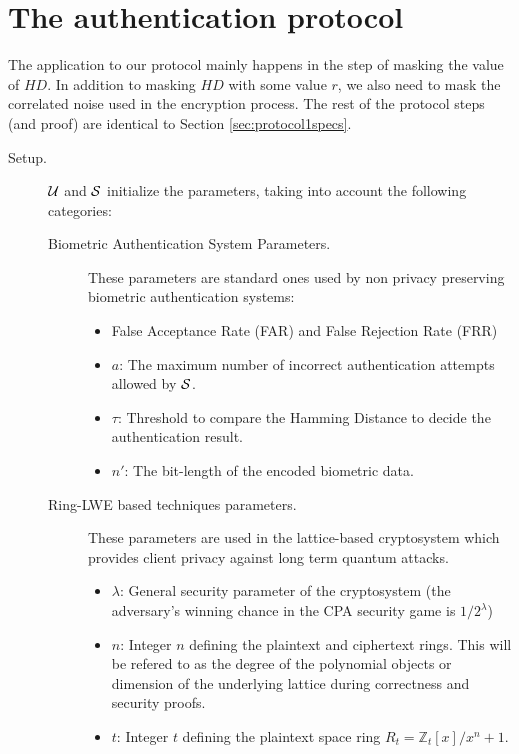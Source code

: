 \section{The authentication protocol}
\label{sec:our_protocol}
The application to our protocol mainly happens in the step of masking the value of $HD$. In addition to masking $HD$ with some value $r$, we also need to mask the correlated noise used in the encryption process. The rest of the protocol steps (and proof) are identical to Section \ref{sec:protocol1specs}.
\begin{description}
\item[Setup.] $\mathcal{U}$ and $\mathcal{S}$ initialize the parameters, taking into account the following categories:
  \begin{description}
  \item[Biometric Authentication System Parameters.] These parameters are
    standard ones used by non privacy preserving biometric authentication
    systems:
    \begin{itemize}
    \item False Acceptance Rate (FAR) and False Rejection Rate (FRR)
    \item $a$: The maximum number of incorrect authentication attempts allowed
      by $\mathcal{S}$.
    \item $\tau$: Threshold to compare the Hamming Distance to decide the
      authentication result.
    \item \(n'\): The bit-length of the encoded biometric data.
    \end{itemize}
  \item[Ring-LWE based techniques parameters.] These parameters are used in the
    lattice-based cryptosystem which provides client privacy against long term
    quantum attacks.
    \begin{itemize}
    \item $\lambda$: General security parameter of the cryptosystem (the
      adversary's winning chance in the CPA security game is \(1/2^{\lambda}\))
    \item $n$: Integer $n$ defining the plaintext and ciphertext rings. This
      will be refered to as the degree of the polynomial objects or dimension of
      the underlying lattice during correctness and security proofs.
    \item $t$: Integer $t$ defining the plaintext space ring
      $R_t = \mathbb{Z}_t[x]/x^n+1$.

\end{itemize}
\end{description}
\end{description}
